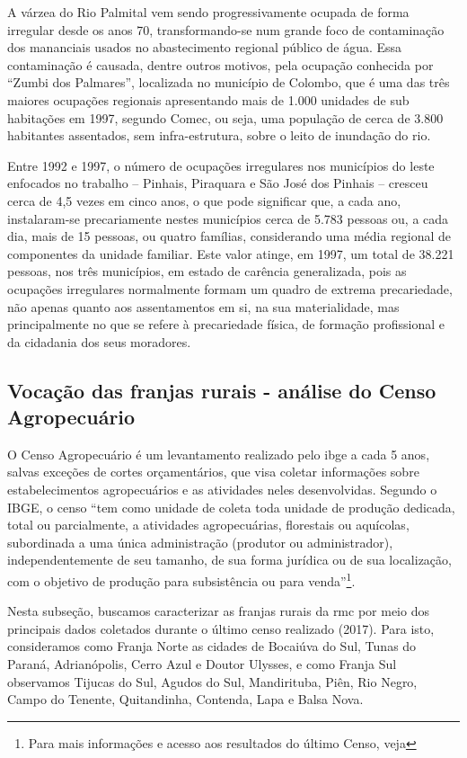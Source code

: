	A várzea do Rio Palmital vem sendo progressivamente ocupada de forma irregular desde os anos 70, transformando-se num grande foco de contaminação dos mananciais usados no abastecimento regional público de água. Essa contaminação é causada, dentre outros motivos, pela ocupação conhecida por “Zumbi dos Palmares”, localizada no município de Colombo, que é uma das três maiores ocupações regionais apresentando mais de 1.000 unidades de sub habitações em 1997, segundo Comec, ou seja, uma população de cerca de 3.800 habitantes assentados, sem infra-estrutura, sobre o leito de inundação do rio. 
	
	Entre 1992 e 1997, o número de ocupações irregulares nos municípios do leste enfocados no trabalho – Pinhais, Piraquara e São José dos Pinhais – cresceu cerca de 4,5 vezes em cinco anos, o que pode significar que, a cada ano, instalaram-se precariamente nestes municípios cerca de 5.783 pessoas ou, a cada dia, mais de 15 pessoas, ou quatro famílias, considerando uma média regional de componentes da unidade familiar. Este valor atinge, em 1997, um total de 38.221 pessoas, nos três municípios, em estado de carência generalizada, pois as ocupações irregulares normalmente formam um quadro de extrema precariedade, não apenas quanto aos assentamentos em si, na sua materialidade, mas principalmente no que se refere à precariedade física, de formação profissional e da cidadania dos seus moradores.
	
	\subsection{Vocação das franjas rurais - análise do Censo Agropecuário}
	
	O Censo Agropecuário é um levantamento realizado pelo \gls{ibge} a cada 5 anos, salvas exceções de cortes orçamentários, que visa coletar informações sobre estabelecimentos agropecuários e as atividades neles desenvolvidas. Segundo o IBGE, o censo ``tem como unidade de coleta toda unidade de produção dedicada, total ou parcialmente, a atividades agropecuárias, florestais ou aquícolas, subordinada a uma única administração (produtor ou administrador), independentemente de seu tamanho, de sua forma jurídica ou de sua localização, com o objetivo de produção para subsistência ou para venda''\footnote{Para mais informações e acesso aos resultados do último Censo, veja }.
	
	Nesta subseção, buscamos caracterizar as franjas rurais da \gls{rmc} por meio dos principais dados coletados durante o último censo realizado (2017). Para isto, consideramos como Franja Norte as cidades de Bocaiúva do Sul, Tunas do Paraná, Adrianópolis, Cerro Azul e Doutor Ulysses, e como Franja Sul observamos Tijucas do Sul, Agudos do Sul, Mandirituba, Piên, Rio Negro, Campo do Tenente, Quitandinha, Contenda, Lapa e Balsa Nova.
	

